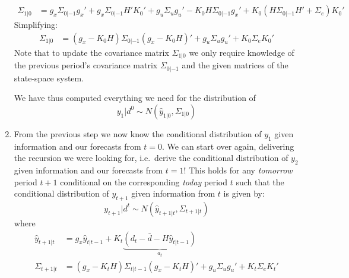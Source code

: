 \begin{enumerate}
\begin{align*}
\\
\Sigma_{1|0}&=g_x \Sigma_{0|-1}g_x' + g_x \Sigma_{0|-1}H'K_0' + g_u \Sigma_u g_u' - K_0 H \Sigma_{0|-1}g_x' + K_0(H\Sigma_{0|-1}H' + \Sigma_e)K_0'
\end{align*}	
Simplifying:
\begin{align*}
\Sigma_{1|0} &= (g_x - K_0 H) \Sigma_{0|-1} (g_x - K_0 H)' + g_u \Sigma_u g_u' + K_0 \Sigma_e K_0'
\end{align*}
Note that to update the covariance matrix \(\Sigma_{1|0}\)
  we only require knowledge of the previous period's covariance matrix \(\Sigma_{0|-1}\)
  and the given matrices of the state-space system.

We have thus computed everything we need for the distribution of
\begin{equation*}
y_1|d^0 \sim N(\hat{y}_{1|0},\Sigma_{1|0})
\end{equation*}

\item From the previous step we now know the conditional distribution of \(y_1\) given information and our forecasts from \(t=0\).
We can start over again, delivering the recursion we were looking for, i.e.\
  derive the conditional distribution of \(y_2\) given information and our forecasts from \(t=1\)!
This holds for any \emph{tomorrow} period \(t+1\) conditional on the corresponding \emph{today} period \(t\)
  such that the conditional distribution of \(y_{t+1}\) given information from \(t\) is given by:
\begin{equation*}
y_{t+1}|d^t \sim N(\hat{y}_{t+1|t},\Sigma_{t+1|t})
\end{equation*}
where
\begin{align*}
\hat{y}_{t+1|t} &= g_x \hat{y}_{t|t-1} + K_t \underbrace{\left(d_t-\bar{d} - H\hat{y}_{t|t-1}\right)}_{a_t}
\\
\Sigma_{t+1|t} &= (g_x - K_t H) \Sigma_{t|t-1} (g_x - K_t H)' + g_u \Sigma_u g_u' + K_t \Sigma_e K_t'
\end{align*}


\end{enumerate}
